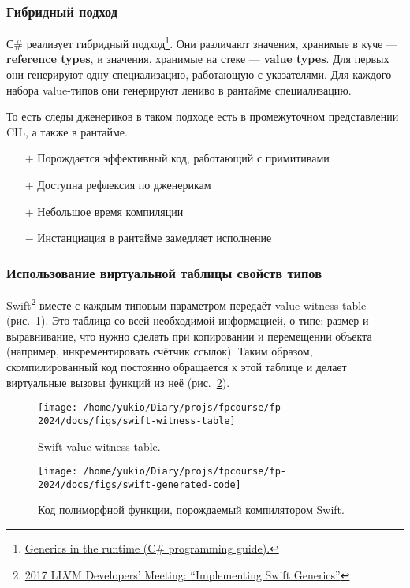 \documentclass[12pt]{article}
\newcommand{\vocab}[1]{\textbf{#1}} %
\newcommand{\positive}{$+$} %
\newcommand{\negative}{{\color{red} $-$}} %
\begin{document}
    \subsubsection{Гибридный подход}

    С\# реализует гибридный подход\footnote{\href{https://learn.microsoft.com/en-us/dotnet/csharp/programming-guide/generics/generics-in-the-run-time}{Generics in the runtime (C\# programming guide).}}.
    Они различают значения, хранимые в куче --- \vocab{reference types}, и значения, хранимые на стеке --- \vocab{value types}.
    Для первых они генерируют одну специализацию, работающую с указателями.
    Для каждого набора value-типов они генерируют лениво в рантайме специализацию.

    То есть следы дженериков в таком подходе есть в промежуточном представлении CIL, а также в рантайме.

    \begin{itemize}
        \item[\positive] Порождается эффективный код, работающий с примитивами
        \item[\positive] Доступна рефлексия по дженерикам
        \item[\positive] Небольшое время компиляции
        \item[\negative] Инстанциация в рантайме замедляет исполнение
    \end{itemize}

    \subsubsection{Использование виртуальной таблицы свойств типов}

    Swift\footnote{\href{https://youtu.be/ctS8FzqcRug?si=y_ZYnuUOulA33d_X}{2017 LLVM Developers’ Meeting: ``Implementing Swift Generics''}} вместе с каждым типовым параметром передаёт value witness table (рис.~\ref{fig:swift-witness-table}).
    Это таблица со всей необходимой информацией, о типе: размер и выравнивание, что нужно сделать при копировании и перемещении объекта (например, инкрементировать счётчик ссылок).
    Таким образом, скомпилированный код постоянно обращается к этой таблице и делает виртуальные вызовы функций из неё (рис.~\ref{fig:swift-generated-code}).
    \begin{figure}
        \centering
        \texttt{[image: /home/yukio/Diary/projs/fpcourse/fp-2024/docs/figs/swift-witness-table]}
        \caption{Swift value witness table.}
        \label{fig:swift-witness-table}
    \end{figure}
    \begin{figure}
        \centering
        \texttt{[image: /home/yukio/Diary/projs/fpcourse/fp-2024/docs/figs/swift-generated-code]}
        \caption{Код полиморфной функции, порождаемый компилятором Swift.}
        \label{fig:swift-generated-code}
    \end{figure}
\end{document}
